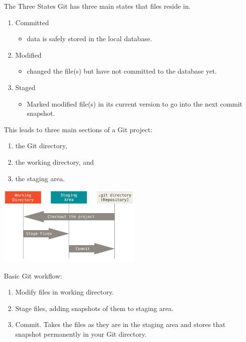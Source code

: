 \begin{frame}[t,allowframebreaks]{The Three States}
  Git has three main states that files reside in.

  \begin{enumerate}
    \item Committed
      \begin{itemize}
        \item data is safely stored in the local database.
      \end{itemize}
    \item Modified
      \begin{itemize}
        \item changed the file(s) but have not committed to the database yet.
      \end{itemize}
    \item Staged
      \begin{itemize}
        \item Marked modified file(s) in its current version to go into the next
          commit snapshot.
      \end{itemize}
  \end{enumerate}

  This leads to three main sections of a Git project:
  \begin{enumerate}
    \item the Git directory,
    \item the working directory, and
    \item the staging area.
  \end{enumerate}

  \pagebreak

  \begin{center}
    \includegraphics[height=1.55in]{../images/02-getting-started/areas.png}
  \end{center}

  Basic Git workflow:
  \begin{enumerate}
    \item Modify files in working directory.
    \item Stage files, adding snapshots of them to staging area.
    \item Commit.  Takes the files as they are in the staging area and stores
      that snapshot permanently in your Git directory.
  \end{enumerate} 
\end{frame}

